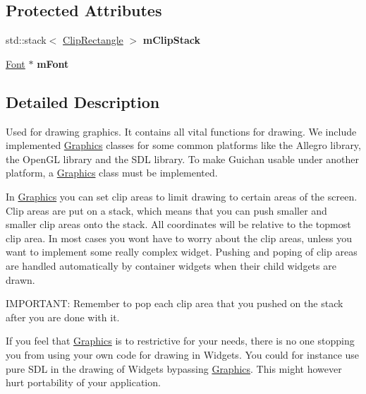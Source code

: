 \subsection*{Protected Attributes}
\begin{DoxyCompactItemize}
\item 
std\+::stack$<$ \hyperlink{classgcn_1_1ClipRectangle}{Clip\+Rectangle} $>$ {\bfseries m\+Clip\+Stack}\hypertarget{classgcn_1_1Graphics_a08be42a39b774cd0ee449a8cc76cc84b}{}\label{classgcn_1_1Graphics_a08be42a39b774cd0ee449a8cc76cc84b}

\item 
\hyperlink{classgcn_1_1Font}{Font} $\ast$ {\bfseries m\+Font}\hypertarget{classgcn_1_1Graphics_af58494bcfd95382cb7af4f0d573b8b1a}{}\label{classgcn_1_1Graphics_af58494bcfd95382cb7af4f0d573b8b1a}

\end{DoxyCompactItemize}


\subsection{Detailed Description}
Used for drawing graphics. It contains all vital functions for drawing. We include implemented \hyperlink{classgcn_1_1Graphics}{Graphics} classes for some common platforms like the Allegro library, the Open\+GL library and the S\+DL library. To make Guichan usable under another platform, a \hyperlink{classgcn_1_1Graphics}{Graphics} class must be implemented.

In \hyperlink{classgcn_1_1Graphics}{Graphics} you can set clip areas to limit drawing to certain areas of the screen. Clip areas are put on a stack, which means that you can push smaller and smaller clip areas onto the stack. All coordinates will be relative to the topmost clip area. In most cases you won\textquotesingle{}t have to worry about the clip areas, unless you want to implement some really complex widget. Pushing and poping of clip areas are handled automatically by container widgets when their child widgets are drawn.

I\+M\+P\+O\+R\+T\+A\+NT\+: Remember to pop each clip area that you pushed on the stack after you are done with it.

If you feel that \hyperlink{classgcn_1_1Graphics}{Graphics} is to restrictive for your needs, there is no one stopping you from using your own code for drawing in Widgets. You could for instance use pure S\+DL in the drawing of Widgets bypassing \hyperlink{classgcn_1_1Graphics}{Graphics}. This might however hurt portability of your application.

